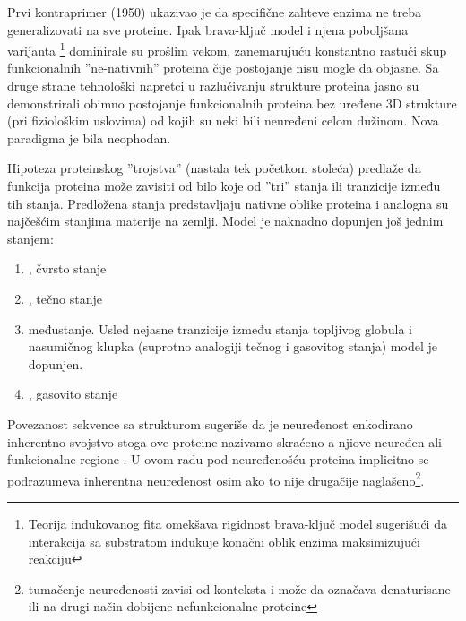 Prvi kontraprimer  (1950) ukazivao je da specifične zahteve
enzima ne treba generalizovati na sve proteine. Ipak brava-ključ model i njena
poboljšana varijanta \footnote{
Teorija indukovanog fita omekšava rigidnost brava-ključ model sugerišući da 
interakcija sa substratom indukuje konačni oblik enzima maksimizujući reakciju\parencite{biology}}
dominirale su prošlim vekom, zanemarujuću konstantno rastući skup funkcionalnih
''ne-nativnih'' proteina čije postojanje nisu mogle da objasne. Sa druge strane
tehnološki napretci u razlučivanju strukture proteina jasno su demonstrirali
obimno postojanje funkcionalnih proteina bez uređene 3D strukture (pri
fiziološkim uslovima)  od kojih su neki bili neuređeni celom
dužinom\parencite{dunker2001}.
Nova paradigma je bila neophodan.

Hipoteza proteinskog ''trojstva''\parencite{dunker2001} (nastala tek početkom
stoleća) predlaže da funkcija proteina može zavisiti od bilo koje od ''tri''
stanja ili tranzicije između tih stanja. Predložena stanja predstavljaju
nativne oblike proteina i analogna su najčešćim stanjima materije na zemlji.
Model je naknadno dopunjen još jednim stanjem:
\begin{enumerate}
  \item {}, čvrsto stanje

  \item {} , tečno stanje

  \item {}  međustanje.
    Usled nejasne tranzicije između stanja topljivog globula i nasumičnog klupka
    (suprotno analogiji tečnog i gasovitog stanja)\parencite{dunker2001} model je
    dopunjen.

  \item {} , gasovito stanje
\end{enumerate}

Povezanost sekvence sa strukturom sugeriše da je neuređenost enkodirano
inherentno svojstvo \parencite{dunker2001} stoga ove proteine nazivamo
 
skraćeno  a njiove neuređen ali funkcionalne regione
\parencite{uversky2016}. U ovom radu pod neuređenošću proteina
implicitno se podrazumeva inherentna neuređenost osim ako to nije drugačije
naglašeno\footnote{
tumačenje neuređenosti zavisi od konteksta i može da označava denaturisane ili na
drugi način dobijene nefunkcionalne proteine}.

